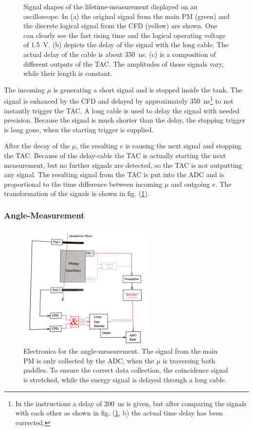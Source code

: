 \begin{figure}[ht]
		\caption{Signal shapes of the lifetime-measurement displayed on an oscilloscope.
			In (a) the original signal from the main PM (green) and the discrete logical signal from the CFD (yellow) are shown. One can clearly see the fast rising time and the logical operating voltage of \SI{1.5}{\volt}.
			(b) depicts the delay of the signal with the long cable. The actual delay of the cable is about \SI{350}{\nano\second}.
			(c) is a composition of different outputs of the TAC. The amplitudes of those signals vary, while their length is constant.
		}
		\label{fig:signal_lifetime}
	\end{figure}

	The incoming $\mu$ is generating a short signal and is stopped inside the tank.
	The signal is enhanced by the CFD and delayed by approximately \SI{350}{\nano\second}\footnote{In the instructions a delay of \SI{200}{\nano\second} is given, but after comparing the signals with each other as shown in fig. (\ref{fig:signal_lifetime}, b) the actual time delay has been corrected.} to not instantly trigger the TAC.
	A long cable is used to delay the signal with needed precision.
	Because the signal is much shorter than the delay, the stopping trigger is long gone, when the starting trigger is supplied.
	
	After the decay of the $\mu$, the resulting $e$ is causing the next signal and stopping the TAC.
	Because of the delay-cable the TAC is actually starting the next measurement, but no further signals are detected, so the TAC is not outputting any signal.
	The resulting signal from the TAC is put into the ADC and is proportional to the time difference between incoming $\mu$ and outgoing $e$.
	The transformation of the signals is shown in fig. (\ref{fig:signal_lifetime}).
	
\subsubsection{Angle-Measurement}

	\begin{figure}[ht]
		\centering
		\includegraphics[width=0.6\textwidth]{img/winkel.jpg}
		\caption{Electronics for the angle-measurement.
				The signal from the main PM is only collected by the ADC, when the $\mu$ is traversing both paddles.
				To ensure the correct data collection, the coincidence signal is stretched, while the energy signal is delayed through a long cable.
			}
		\label{fig:electronics_angle}
	\end{figure}

